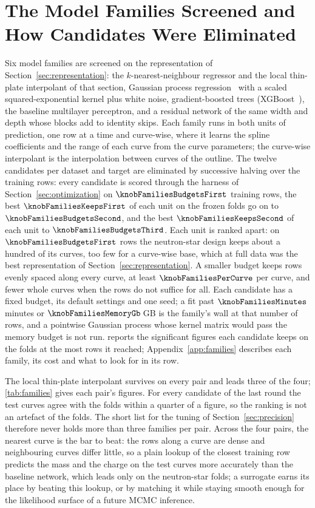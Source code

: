\section{The Model Families Screened and How Candidates Were Eliminated}
\label{sec:families}

Six model families are screened on the representation of Section~\ref{sec:representation}: the $k$-nearest-neighbour regressor and the local thin-plate interpolant of that section, Gaussian process regression~\citep{Rasmussen2005_GP} with a scaled squared-exponential kernel plus white noise, gradient-boosted trees (XGBoost~\citep{TODO_XGBoost}), the baseline multilayer perceptron, and a residual network of the same width and depth whose blocks add to identity skips. Each family runs in both units of prediction, one row at a time and curve-wise, where it learns the spline coefficients and the range of each curve from the curve parameters; the curve-wise interpolant is the interpolation between curves of the outline. The twelve candidates per dataset and target are eliminated by successive halving over the training rows: every candidate is scored through the harness of Section~\ref{sec:optimization} on $\knobFamiliesBudgetsFirst$ training rows, the best $\knobFamiliesKeepsFirst$ of each unit on the frozen folds go on to $\knobFamiliesBudgetsSecond$, and the best $\knobFamiliesKeepsSecond$ of each unit to $\knobFamiliesBudgetsThird$. Each unit is ranked apart: on $\knobFamiliesBudgetsFirst$ rows the neutron-star design keeps about a hundred of its curves, too few for a curve-wise base, which at full data was the best representation of Section~\ref{sec:representation}. A smaller budget keeps rows evenly spaced along every curve, at least $\knobFamiliesPerCurve$ per curve, and fewer whole curves when the rows do not suffice for all. Each candidate has a fixed budget, its default settings and one seed; a fit past $\knobFamiliesMinutes$ minutes or $\knobFamiliesMemoryGb$\,GB is the family's wall at that number of rows, and a pointwise Gaussian process whose kernel matrix would pass the memory budget is not run.  reports the significant figures each candidate keeps on the folds at the most rows it reached; Appendix~\ref{app:families} describes each family, its cost and what to look for in its row.


The local thin-plate interpolant survives on every pair and leads three of the four; \cref{tab:families} gives each pair's figures. For every candidate of the last round the test curves agree with the folds within a quarter of a figure, so the ranking is not an artefact of the folds. The short list for the tuning of Section~\ref{sec:precision} therefore never holds more than three families per pair. Across the four pairs, the nearest curve is the bar to beat: the rows along a curve are dense and neighbouring curves differ little, so a plain lookup of the closest training row predicts the mass and the charge on the test curves more accurately than the baseline network, which leads only on the neutron-star folds; a surrogate earns its place by beating this lookup, or by matching it while staying smooth enough for the likelihood surface of a future MCMC inference.

